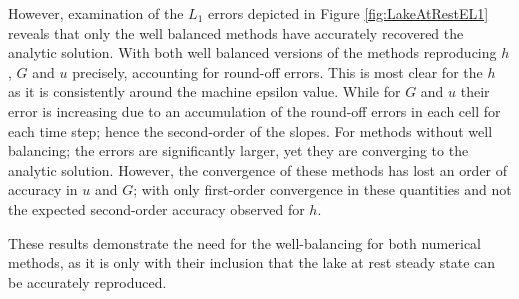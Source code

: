 However, examination of the $L_1$ errors depicted in Figure \ref{fig:LakeAtRestEL1} reveals that only  the well balanced methods have accurately recovered the analytic solution. With both well balanced versions of the methods reproducing $h$, $G$ and $u$ precisely, accounting for round-off errors. This is most clear for the $h$ as it is consistently around the machine epsilon value. While for $G$ and $u$ their error is increasing due to an accumulation of the round-off errors in each cell for each time step; hence the second-order of the slopes. For methods without well balancing; the errors are significantly larger, yet they are converging to the analytic solution. However, the convergence of these methods has lost an order of accuracy in $u$ and $G$; with only first-order convergence in these quantities and not the expected second-order accuracy observed for $h$. 

These results demonstrate the need for the well-balancing for both numerical methods, as it is only with their inclusion that the lake at rest steady state can be accurately reproduced. 



